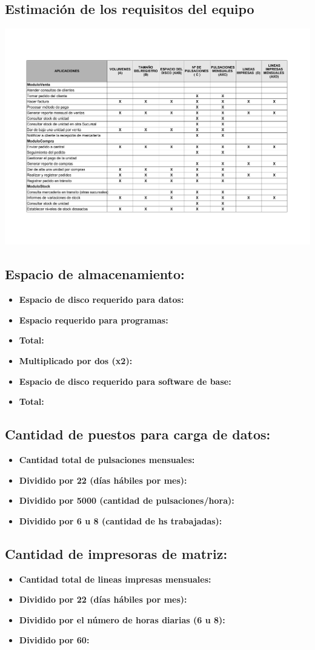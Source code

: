 \subsection{Estimación de los requisitos del equipo}

\includegraphics[width=630px,angle=90]{fase2/volumenes_datos/volumenes_de_datos.pdf}


\clearpage

\subsection{Espacio de almacenamiento:}
\begin{itemize}
  \item \textbf{Espacio de disco requerido para datos:}
  \item \textbf{Espacio requerido para programas:}
  \item \textbf{Total:}
  \item \textbf{Multiplicado por dos (x2):}
  \item \textbf{Espacio de disco requerido para software de base:}
  \item \textbf{Total:}
\end{itemize}

\subsection{Cantidad de puestos para carga de datos:}
\begin{itemize}
  \item \textbf{Cantidad total de pulsaciones mensuales:}
  \item \textbf{Dividido por 22 (días hábiles por mes):}
  \item \textbf{Dividido por 5000 (cantidad de pulsaciones/hora):}
  \item \textbf{Dividido por 6 u 8 (cantidad de hs trabajadas):}
\end{itemize}

\subsection{Cantidad de impresoras de matriz:}
\begin{itemize}
  \item \textbf{Cantidad total de lineas impresas mensuales:}
  \item \textbf{Dividido por 22 (días hábiles por mes):}
  \item \textbf{Dividido por el número de horas diarias (6 u 8):}
  \item \textbf{Dividido por 60:}
\end{itemize}

